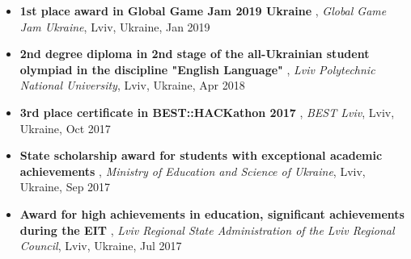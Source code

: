 \documentclass[letterpaper,10pt]{article}
\newcommand{\titleItem}[1]{
  \textbf{#1}
}
\begin{document}
\begin{itemize}[leftmargin=0.15in, label={}]
    \item
			\titleItem{1st place award in Global Game Jam 2019 Ukraine}, \emph{Global Game Jam Ukraine}, {Lviv, Ukraine}, Jan 2019
			\vspace{-9pt}
		
    \item
			\titleItem{2nd degree diploma in 2nd stage of the all-Ukrainian student olympiad in the discipline "English Language"}, \emph{Lviv Polytechnic National University}, {Lviv, Ukraine}, Apr 2018
			\vspace{-9pt}
		
    \item
			\titleItem{3rd place certificate in BEST::HACKathon 2017}, \emph{BEST Lviv}, {Lviv, Ukraine}, Oct 2017
			\vspace{-9pt}
		
    \item
			\titleItem{State scholarship award for students with exceptional academic achievements}, \emph{Ministry of Education and Science of Ukraine}, {Lviv, Ukraine}, Sep 2017
			\vspace{-9pt}
		
    \item
			\titleItem{Award for high achievements in education, significant achievements during the EIT}, \emph{Lviv Regional State Administration of the Lviv Regional Council}, {Lviv, Ukraine}, Jul 2017
			\vspace{-9pt}
		
    \end{itemize}
	

\end{document}
